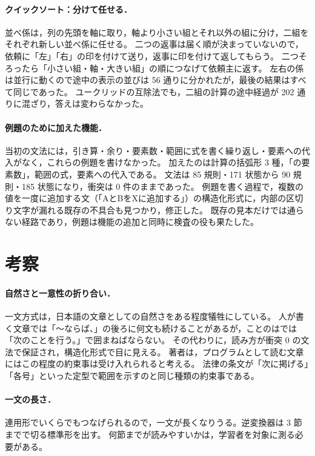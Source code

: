 \documentclass[a4paper,10pt]{ltjsarticle}
\begin{document}
\paragraph{クイックソート：分けて任せる．}
並べ係は，列の先頭を軸に取り，軸より小さい組とそれ以外の組に分け，二組をそれぞれ新しい並べ係に任せる。
二つの返事は届く順が決まっていないので，依頼に「左」「右」の印を付けて送り，返事に印を付けて返してもらう。
二つそろったら「小さい組・軸・大きい組」の順につなげて依頼主に返す。
左右の係は並行に動くので途中の表示の並びは 56 通りに分かれたが，最後の結果はすべて同じであった。
ユークリッドの互除法でも，二組の計算の途中経過が 202 通りに混ざり，答えは変わらなかった。

\paragraph{例題のために加えた機能．}
当初の文法には，引き算・余り・要素数・範囲に式を書く繰り返し・要素への代入がなく，これらの例題を書けなかった。
加えたのは計算の括弧形 3 種，「の要素数」，範囲の式，要素への代入である。
文法は 85 規則・171 状態から 90 規則・185 状態になり，衝突は 0 件のままであった。
例題を書く過程で，複数の値を一度に追加する文（「AとBをXに追加する」）の構造化形式に，内部の区切り文字が漏れる既存の不具合も見つかり，修正した。
既存の見本だけでは通らない経路であり，例題は機能の追加と同時に検査の役も果たした。

\section{考察}

\paragraph{自然さと一意性の折り合い．}
一文方式は，日本語の文章としての自然さをある程度犠牲にしている。
人が書く文章では「〜ならば、」の後ろに何文も続けることがあるが，ことのはでは「次のことを行う。」で囲まねばならない。
その代わりに，読み方が衝突 0 の文法で保証され，構造化形式で目に見える。
著者は，プログラムとして読む文章にはこの程度の約束事は受け入れられると考える。
法律の条文が「次に掲げる」「各号」といった定型で範囲を示すのと同じ種類の約束事である。

\paragraph{一文の長さ．}
連用形でいくらでもつなげられるので，一文が長くなりうる。逆変換器は 3 節までで切る標準形を出す。
何節までが読みやすいかは，学習者を対象に測る必要がある。
\end{document}
